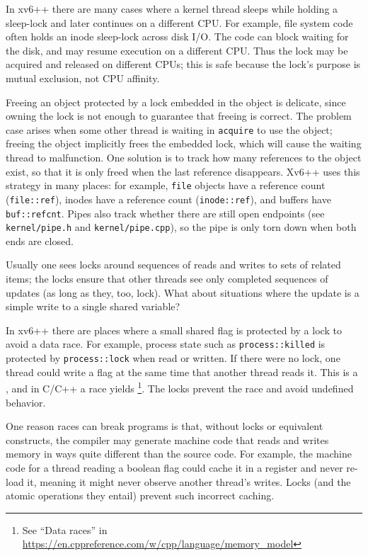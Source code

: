 In xv6++ there are many cases where a kernel thread sleeps while holding a
sleep-lock and later continues on a different CPU. For example, file system
code often holds an inode sleep-lock across disk I/O. The code can block waiting
for the disk, and may resume execution on a different CPU. Thus the lock may be
acquired and released on different CPUs; this is safe because the lock's purpose
is mutual exclusion, not CPU affinity.

Freeing an object protected by a lock embedded in the object is delicate, since
owning the lock is not enough to guarantee that freeing is correct.
The problem case arises when some other thread is waiting in \lstinline{acquire}
to use the object; freeing the object implicitly frees the embedded lock, which
will cause the waiting thread to malfunction.
One solution is to track how many references to the object exist, so that it is
only freed when the last reference disappears.
Xv6++ uses this strategy in many places: for example, \lstinline{file} objects
have a reference count (\lstinline{file::ref}), inodes have a reference count
(\lstinline{inode::ref}), and buffers have \lstinline{buf::refcnt}.
Pipes also track whether there are still open endpoints (see
\texttt{kernel/pipe.h} and \texttt{kernel/pipe.cpp}), so the pipe is only torn
down when both ends are closed.

Usually one sees locks around sequences of reads and writes to sets of related
items; the locks ensure that other threads see only completed sequences of
updates (as long as they, too, lock). What about situations where the update is
a simple write to a single shared variable?

In xv6++ there are places where a small shared flag is protected by a lock to
avoid a data race. For example, process state such as \lstinline{process::killed}
is protected by \lstinline{process::lock} when read or written.
If there were no lock, one thread could write a flag at the same time that
another thread reads it. This is a , and in C/C++ a race yields
\footnote{See ``Data races'' in
\url{https://en.cppreference.com/w/cpp/language/memory_model}}.
The locks prevent the race and avoid undefined behavior.

One reason races can break programs is that, without locks or equivalent
constructs, the compiler may generate machine code that reads and writes memory
in ways quite different than the source code. For example, the machine code for
a thread reading a boolean flag could cache it in a register and never re-load
it, meaning it might never observe another thread's writes. Locks (and the
atomic operations they entail) prevent such incorrect caching.


